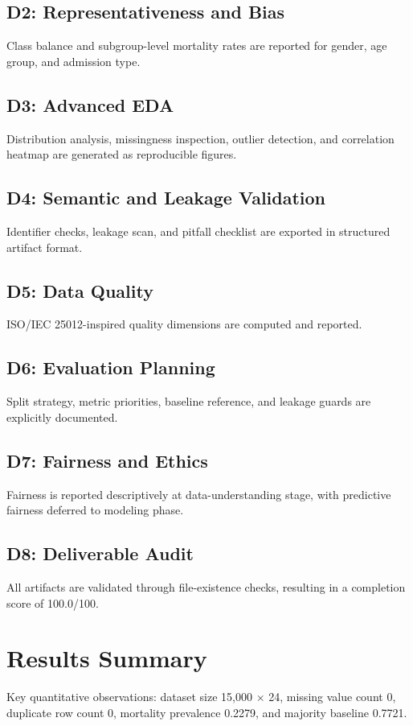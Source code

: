 \documentclass[conference]{IEEEtran}
\begin{document}
\subsection{D2: Representativeness and Bias}
Class balance and subgroup-level mortality rates are reported for gender, age group, and admission type.

\subsection{D3: Advanced EDA}
Distribution analysis, missingness inspection, outlier detection, and correlation heatmap are generated as reproducible figures.

\subsection{D4: Semantic and Leakage Validation}
Identifier checks, leakage scan, and pitfall checklist are exported in structured artifact format.

\subsection{D5: Data Quality}
ISO/IEC 25012-inspired quality dimensions are computed and reported.

\subsection{D6: Evaluation Planning}
Split strategy, metric priorities, baseline reference, and leakage guards are explicitly documented.

\subsection{D7: Fairness and Ethics}
Fairness is reported descriptively at data-understanding stage, with predictive fairness deferred to modeling phase.

\subsection{D8: Deliverable Audit}
All artifacts are validated through file-existence checks, resulting in a completion score of 100.0/100.

\section{Results Summary}
Key quantitative observations: dataset size 15,000 $\times$ 24, missing value count 0, duplicate row count 0, mortality prevalence 0.2279, and majority baseline 0.7721.
\end{document}
